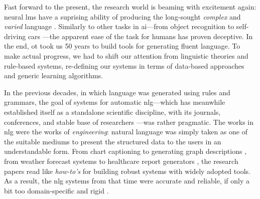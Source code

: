 Fast forward to the present, the research world is beaming with excitement again: neural \acp{lm} have a suprising ability of producing the long-sought \emph{complex} and \emph{varied} language \cite{radford2019language,brown2020language}. Similarly to other tasks in \ac{ai}---from object recognition \cite{papert1966summer} to self-driving cars \cite{autonomouscars}---the apparent ease of the task for humans has proven deceptive. In the end, ot took us 50 years to build tools for generating fluent language. To make actual progress, we had to shift our attention from linguistic theories and rule-based systems, re-defining our systems in terms of data-based approaches and generic learning algorithms.

In the previous decades, in which language was generated using rules and grammars, the goal of systems for automatic \ac{nlg}---which has meanwhile established itself as a standalone scientific discipline, with its journals, conferences, and stable base of researchers \cite{ACLanthologySIGGEN}---was rather pragmatic.
The works in \ac{nlg} were the works of \emph{engineering}: natural language was simply taken as one of the suitable mediums to present the structured data to the users in an understandable form. From chart captioning \cite{mittalDescribingComplexCharts1998} to generating graph descriptions \cite{sunDomainIndependentSentence2006}, from weather forecast systems \cite{belzAutomaticGenerationWeather2008} to healthcare report generators \cite{portetAutomaticGenerationTextual2009}, the research papers read like \emph{how-to's} for building robust systems with widely adopted tools. As a result, the \ac{nlg} systems from that time were accurate and reliable, if only a bit too domain-specific and rigid \cite{reiterBuildingAppliedNatural1997,gattSurveyStateArt2018}.


